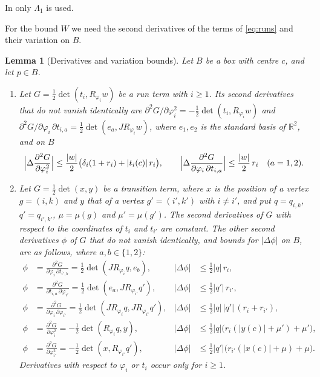 \documentclass[11pt]{amsart}
\newtheorem{lemma}[theorem]{Lemma}
\theoremstyle{definition}
\theoremstyle{remark}
\numberwithin{equation}{section}
\newcommand{\R}{\mathbb{R}}
\begin{document}
In \cite[Lemma~3.5]{Tom26} only $\Lambda_1$ is used.

For the bound $W$ we need the second derivatives of the terms of \eqref{eq:runs} and their variation on $B$.

\begin{lemma}[Derivatives and variation bounds]\label{lem:deriv}
Let $B$ be a box with centre $c$, and let $p\in B$.
\begin{enumerate}[label=\textup{(\alph*)},leftmargin=*]
\item Let $G=\frac12\det(t_i,R_{\varphi_i}w)$ be a run term with $i\ge1$. Its second derivatives that do not vanish identically are $\partial^2G/\partial\varphi_i^2=-\frac12\det(t_i,R_{\varphi_i}w)$ and $\partial^2G/\partial\varphi_i\,\partial t_{i,a}=\frac12\det(e_a,JR_{\varphi_i}w)$, where $e_1,e_2$ is the standard basis of $\R^2$, and on $B$
\[
\Bigl|\Delta\frac{\partial^2G}{\partial\varphi_i^2}\Bigr|\le\frac{|w|}2\bigl(\delta_i(1+r_i)+|t_i(c)|\,r_i\bigr),\qquad\Bigl|\Delta\frac{\partial^2G}{\partial\varphi_i\,\partial t_{i,a}}\Bigr|\le\frac{|w|}2\,r_i\quad(a=1,2).
\]
\item Let $G=\frac12\det(x,y)$ be a transition term, where $x$ is the position of a vertex $g=(i,k)$ and $y$ that of a vertex $g'=(i',k')$ with $i\ne i'$, and put $q=q_{i,k}$, $q'=q_{i',k'}$, $\mu=\mu(g)$ and $\mu'=\mu(g')$. The second derivatives of $G$ with respect to the coordinates of $t_i$ and $t_{i'}$ are constant. The other second derivatives $\phi$ of $G$ that do not vanish identically, and bounds for $|\Delta\phi|$ on $B$, are as follows, where $a,b\in\{1,2\}$:
\begin{align*}
\phi&=\frac{\partial^2G}{\partial\varphi_i\,\partial t_{i',b}}=\frac12\det(JR_{\varphi_i}q,e_b),&|\Delta\phi|&\le\tfrac12|q|\,r_i,\\
\phi&=\frac{\partial^2G}{\partial t_{i,a}\,\partial\varphi_{i'}}=\frac12\det(e_a,JR_{\varphi_{i'}}q'),&|\Delta\phi|&\le\tfrac12|q'|\,r_{i'},\\
\phi&=\frac{\partial^2G}{\partial\varphi_i\,\partial\varphi_{i'}}=\frac12\det(JR_{\varphi_i}q,JR_{\varphi_{i'}}q'),&|\Delta\phi|&\le\tfrac12|q|\,|q'|\,(r_i+r_{i'}),\\
\phi&=\frac{\partial^2G}{\partial\varphi_i^2}=-\frac12\det(R_{\varphi_i}q,y),&|\Delta\phi|&\le\tfrac12|q|\bigl(r_i(|y(c)|+\mu')+\mu'\bigr),\\
\phi&=\frac{\partial^2G}{\partial\varphi_{i'}^2}=-\frac12\det(x,R_{\varphi_{i'}}q'),&|\Delta\phi|&\le\tfrac12|q'|\bigl(r_{i'}(|x(c)|+\mu)+\mu\bigr).
\end{align*}
Derivatives with respect to $\varphi_i$ or $t_i$ occur only for $i\ge1$.
\end{enumerate}
\end{lemma}
\end{document}
